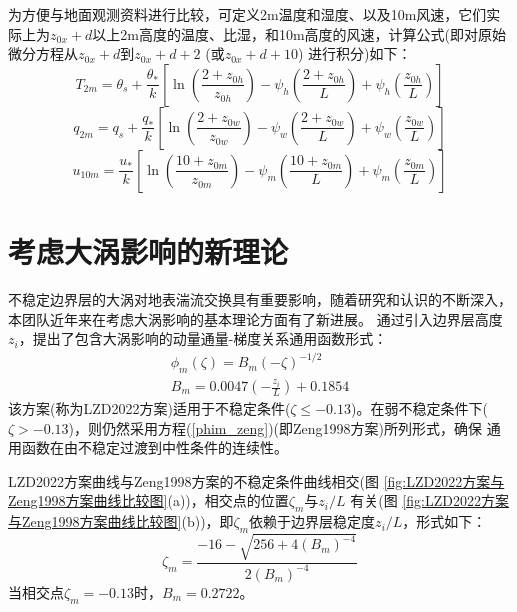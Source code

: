为方便与地面观测资料进行比较，可定义2m温度和湿度、以及10m风速，它们实际上为$z_{0x}+d$以上2m高度的温度、比湿，和10m高度的风速，计算公式(即对原始微分方程从$z_{0x}+d$到$z_{0x}+d+2$ (或$z_{0x}+d+10$) 进行积分)如下：
\begin{equation}\label{T2m}
T_{2 m}=\theta_{s}+\frac{\theta_{*}}{k}\left[\ln \left(\frac{2+z_{0 h}}{z_{0 h}}\right)-\psi_{h}\left(\frac{2+z_{0 h}}{L}\right)+\psi_{h}\left(\frac{z_{0 h}}{L}\right)\right]
\end{equation}
\begin{equation}\label{q2m}
q_{2 m}=q_{s}+\frac{q_{*}}{k}\left[\ln \left(\frac{2+z_{0 w}}{z_{0 w}}\right)-\psi_{w}\left(\frac{2+z_{0 w}}{L}\right)+\psi_{w}\left(\frac{z_{0 w}}{L}\right)\right]
\end{equation}
\begin{equation}
u_{10 m}=\frac{u_{*}}{k}\left[\ln \left(\frac{10+z_{0 m}}{z_{0 m}}\right)-\psi_{m}\left(\frac{10+z_{0 m}}{L}\right)+\psi_{m}\left(\frac{z_{0 m}}{L}\right)\right]
\end{equation}


\section{考虑大涡影响的新理论}\label{考虑大涡影响的新理论}
不稳定边界层的大涡对地表湍流交换具有重要影响，随着研究和认识的不断深入，本团队近年来在考虑大涡影响的基本理论方面有了新进展。\citet{liu2019further,liu2022surface}
通过引入边界层高度$z_i$，提出了包含大涡影响的动量通量-梯度关系通用函数形式：
\begin{equation}
     \begin{array}{c}\phi_{m}(\zeta)=B_{m} (-\zeta)^{-1/2} \\
          B_{m}=0.0047(-\frac{z_{i}}{L})+0.1854
     \end{array}
\end{equation}
该方案(称为LZD2022方案)适用于不稳定条件($\zeta \leq -0.13$)。在弱不稳定条件下($\zeta > -0.13$)，则仍然采用方程(\ref{phim_zeng})(即Zeng1998方案)所列形式，确保
通用函数在由不稳定过渡到中性条件的连续性。

LZD2022方案曲线与Zeng1998方案的不稳定条件曲线相交(图 \ref{fig:LZD2022方案与Zeng1998方案曲线比较图}(a))，相交点的位置$\zeta_{m}$与${z_{i}}/{L}$
有关(图 \ref{fig:LZD2022方案与Zeng1998方案曲线比较图}(b))，即$\zeta_{m}$依赖于边界层稳定度${z_{i}}/{L}$，形式如下：
\begin{equation}
     \zeta_{m}=\frac{-16-\sqrt{256+4 \left(B_{m}\right)^{-4}}}{2 \left(B_{m}\right)^{-4}}
\end{equation}
当相交点$\zeta_{m}=-0.13$时，$B_{m}=0.2722$。

